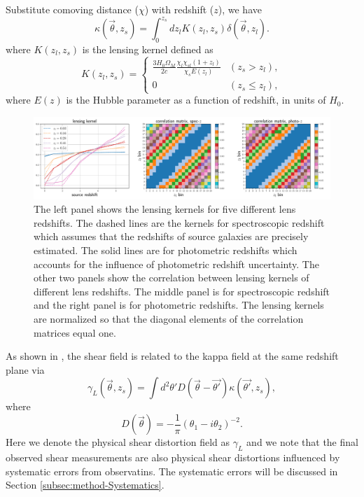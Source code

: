 \documentclass[twocolumn]{aastex62}
\begin{document}
Substitute comoving distance ($\chi$) with redshift ($z$), we have
\begin{equation}\label{eq-delta2kappa}
\kappa(\vec{\theta},z_s)=\int_0^{z_s} dz_l K(z_l,z_s)\delta(\vec{\theta},z_l).
\end{equation}
where $K(z_l,z_s)$ is the lensing kernel defined as
\begin{equation}
K(z_l,z_s) =
\begin{cases}
\frac{3H_0\Omega_M}{2 c} \frac{\chi_l \chi_{sl} (1+z_l)}{\chi_{s} E\left(z_l\right)} & (z_s>z_l),\\
0&(z_s \leq z_l),
\end{cases}
\end{equation}
where $E(z)$ is the Hubble parameter as a function of redshift, in units of $H_0$.

\begin{figure}[!t]
 \centering
 \includegraphics[width=1.\textwidth]{lensing_kernel.pdf}
 \caption{The left panel shows the lensing kernels for five different lens redshifts. The dashed lines are the 
        kernels for spectroscopic redshift which assumes that the redshifts of source galaxies are precisely 
        estimated. The solid lines are for photometric redshifts which accounts for the influence of photometric 
        redshift uncertainty. The other two panels show the correlation between lensing kernels of different 
        lens redshifts. The middle panel is for spectroscopic redshift and the right panel is for photometric 
        redshifts. The lensing kernels are normalized so that the diagonal elements of the correlation matrices
        equal one.}\label{fig-corlensKer}
\end{figure}

As shown in \citet{massMap-KS1993}, the shear field is related to the kappa field at the same redshift plane
via
\begin{equation}\label{eq-kappa2gamma}
\gamma_L(\vec{\theta},z_s) = \int  d^2 \theta' D(\vec{\theta}-\vec{\theta'}) \kappa(\vec{\theta'},z_s),
\end{equation}
where
\begin{equation}
D(\vec{\theta})=-\frac{1}{\pi}(\theta_1-i\theta_2)^{-2}.
\end{equation}
Here we denote the physical shear distortion field as $\gamma_L$ and we note that the final observed shear measurements 
are also physical shear distortions influenced by systematic errors from observatins. The systematic errors will be discussed 
in Section \ref{subsec:method-Systematics}.
\end{document}
